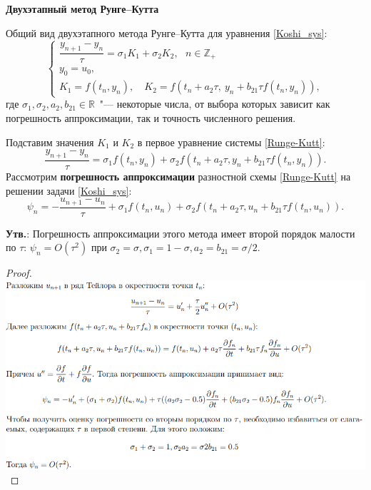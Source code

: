 \bigbreak

\centerline{\textbf{Двухэтапный метод Рунге--Кутта}}
Общий вид двухэтапного метода Рунге--Кутта для уравнения \eqref{Koshi_sys}:
\begin{equation}
%
    \label{Runge-Kutt}
    \begin{cases}
        \dfrac{y_{n+1} - y_n}{\tau} = \sigma_1 K_1 + \sigma_2 K_2,~~~n\in \mathbb{Z}_+ \\
        y_0 = u_0, \\
        K_1 = f(t_n, y_n), \quad K_2 = f(t_n + a_2\tau, ~ y_n + b_{21} \tau f(t_n, y_n)),
    \end{cases}
%
\end{equation}
где $\sigma_1, \sigma_2,a_{2}, b_{21} \in\mathbb{R}$~"--- некоторые числа, от выбора которых зависит как погрешность аппроксимации, так и точность численного решения.

Подставим значения $K_1$ и $K_2$ в первое уравнение системы \eqref{Runge-Kutt}:
%
$$
    \frac{y_{n+1} - y_n}{\tau} = \sigma_1 f(t_n, y_n) +
    \sigma_2 f(t_n + a_2 \tau, y_n + b_{21} \tau f(t_n, y_n)).
$$
%
Рассмотрим \textbf{погрешность аппроксимации} разностной схемы \eqref{Runge-Kutt}
на решении задачи \eqref{Koshi_sys}:
%
\begin{equation}
%
    \label{Runge-Kutt_appr}
    \psi_n = - \frac{u_{n+1} - u_n}{\tau} + \sigma_1 f(t_n, u_n) +
    \sigma_2 f\left(t_n+a_2\tau, u_n + b_{21}\tau f(t_n, u_n)\right).
%
\end{equation}

\textbf{Утв.}: Погрешность аппроксимации этого метода имеет второй порядок малости по $\tau$: $\psi_n = O(\tau^2)$ при $\sigma_2 = \sigma, \sigma_1 = 1-\sigma, a_2 = b_{21} = \sigma/2$.

\begin{proof}

\includegraphics[scale=0.4]{pics/osn_31_new.png}

\end{proof}

